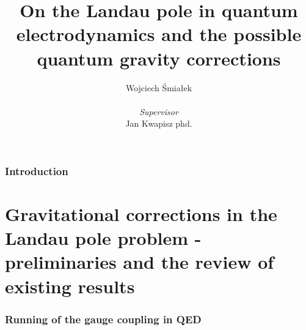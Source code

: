 \documentclass[11pt, a4paper]{article}
\title{\vspace{-2cm}On the Landau pole in quantum electrodynamics and the possible quantum gravity corrections}
\author{{Wojciech Śmiałek}\\
\\
{\textit{Supervisor}} \\
{Jan Kwapisz phd.}}
\date{}
\begin{document}
\maketitle

\section*{Introduction}

\part{Gravitational corrections in the Landau pole problem - preliminaries and the review of existing results}


\section{Running of the gauge coupling in QED}
\end{document}
